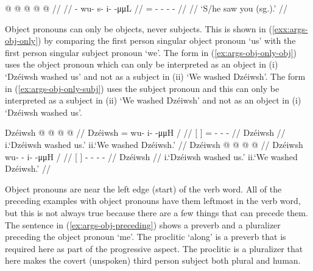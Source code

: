 \ex\label{ex:args-obj-prons-prefix}%
%
\begingl
	\gla	{} @ {} @ {} @ {} @ {} @ {} //	
	\glp	\llap{[}\rlap{\ipa{\gm{ʔì}w.sì.ˈtʰìːn}]} {} {} {} {} {} //
	\glb	{}- wu- s- i-  -μμL //
	\glc	{}= - - -  - //
	\gld	 {} {} {} {} {} {} //
	\glft	‘S/he saw you (sg.).’
		//
\endgl
\xe

Object pronouns can only be objects, never subjects.
This is shown in (\ref{exx:args-obj-only}) by comparing the first person singular object pronoun  ‘us’ with the first person singular subject pronoun  ‘we’.
The form in (\ref{ex:args-obj-only-obj}) uses the object pronoun  which can only be interpreted as an object in (i) ‘Dzéiwsh washed us’ and not as a subject in (ii) ‘We washed Dzéiwsh’.
The form in (\ref{ex:args-obj-only-subj}) uses the subject pronoun  and this can only be interpreted as a subject in (ii) ‘We washed Dzéiwsh’ and not as an object in (i) ‘Dzéiwsh washed us’.

\pex\label{exx:args-obj-only}%
\a\label{ex:args-obj-only-obj}%
%
\begingl
	\gla	{} Dzéiwsh {}  @  @ {} @ {} @ {}  //
	\glb	{} Dzéiwsh {} = wu- i-  -μμH / //
	\glc	{}[  {}] = - -  - //
	\gld	{} Dzéiwsh {}   {} {} {}  //
	\glft	\phantom{i}i.\hspace{1em}‘Dzéiwsh washed us.’\newline
		ii.\hspace{1em}\ljudge{*}‘We washed Dzéiwsh.’
		//
\endgl
\a\label{ex:args-obj-only-subj}%
%
\begingl
	\gla	{} Dzéiwsh {}  @ {} @ {} @ {} @ {} //
	\glb	{} Dzéiwsh {} wu- - i-  -μμH / //
	\glc	{}[  {}] - - -  - //
	\gld	{} Dzéiwsh {}  {} {} {} {} //
	\glft	\phantom{i}i.\hspace{1em}\ljudge{*}‘Dzéiwsh washed us.’\newline
		ii.\hspace{1em}‘We washed Dzéiwsh.’
		//
\endgl
\xe

Object pronouns are near the left edge (start) of the verb word.
All of the preceding examples with object pronouns have them leftmost in the verb word, but this is not always true because there are a few things that can precede them.
The sentence in (\ref{ex:args-obj-preceding}) shows a preverb and a pluralizer preceding the object pronoun  ‘me’.
The proclitic  ‘along’ is a preverb that is required here as part of the progressive aspect.
The proclitic  is a pluralizer that here makes the covert (unspoken) third person subject both plural and human.

